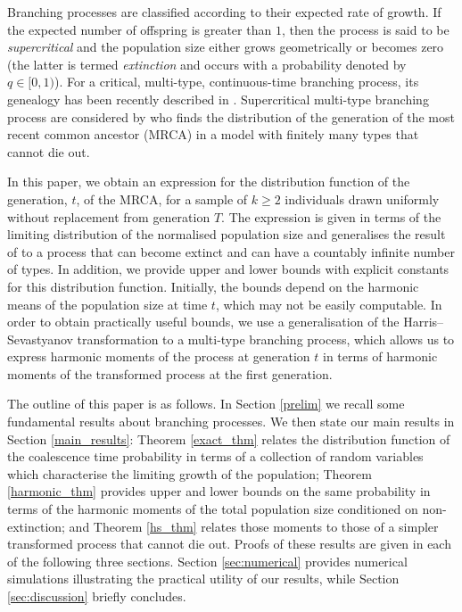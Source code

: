 \documentclass[preprint,3p,12pt]{elsarticle}
\theoremstyle{definition}
\begin{document}
Branching processes are classified according to their expected rate of growth. If the expected number of offspring is greater than $1$, then the process is said to be \emph{supercritical} and the population size either grows geometrically or becomes zero (the latter is termed \emph{extinction} and occurs with a probability denoted by $q \in [0, 1)$). 
For a critical, multi-type, continuous-time branching process, its genealogy has been recently described in \cite{osvaldo}. Supercritical multi-type branching process are considered by \cite{Hong2015} who finds the distribution of the generation of the most recent common ancestor (MRCA) in a model with finitely many types that cannot die out.

In this paper, we obtain an expression for the distribution function of the generation, $t$, of the MRCA, for a sample of $k \ge 2$ individuals drawn uniformly without replacement from generation $T$. The expression is given in terms of the limiting distribution of the normalised population size and generalises the result of \cite{Hong2015} to a process that can become extinct and can have a countably infinite number of types. 
In addition, we provide upper and lower bounds with explicit constants for this distribution function. Initially, the bounds depend on the harmonic means of the population size at time $t$, which may not be easily computable. In order to obtain practically useful bounds, we use a generalisation of the Harris--Sevastyanov transformation to a multi-type branching process, which allows us to express harmonic moments of the process at generation $t$ in terms of harmonic moments of the transformed process at the first generation. 

The outline of this paper is as follows. In Section \ref{prelim} we recall some fundamental results about branching processes. We then state our main results in Section \ref{main_results}: Theorem \ref{exact_thm} relates the distribution function of the coalescence time probability in terms of a collection of random variables which characterise the limiting growth of the population; Theorem \ref{harmonic_thm} provides upper and lower bounds on the same probability in terms of the harmonic moments of the total population size conditioned on non-extinction; and Theorem \ref{hs_thm} relates those moments to those of a simpler transformed process that cannot die out. Proofs of these results are given in each of the following three sections. Section \ref{sec:numerical} provides numerical simulations illustrating the practical utility of our results, while Section \ref{sec:discussion} briefly concludes.
\end{document}
